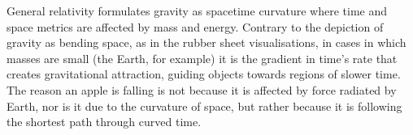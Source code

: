 General relativity formulates gravity as spacetime curvature where time and space metrics are affected by mass and energy. Contrary to the depiction of gravity as bending space, as in the rubber sheet visualisations, in cases in which masses are small (the Earth, for example) it is the gradient in time's rate that creates gravitational attraction, guiding objects towards regions of slower time. The reason an apple is falling is not because it is affected by force radiated by Earth, nor is it due to the curvature of space, but rather because it is following the shortest path through curved time.
